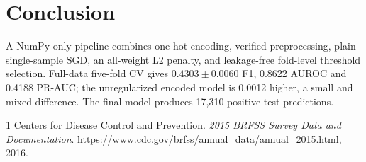 \documentclass[10pt,conference,compsocconf]{IEEEtran}
\begin{document}
\section{Conclusion}
A NumPy-only pipeline combines one-hot encoding, verified preprocessing, plain
single-sample SGD, an all-weight L2 penalty, and leakage-free fold-level
threshold selection. Full-data five-fold CV gives $0.4303\pm0.0060$ F1, 0.8622
AUROC and 0.4188 PR-AUC; the unregularized encoded model is 0.0012 higher, a
small and mixed difference. The final model produces 17{,}310 positive test
predictions.

\begin{thebibliography}{1}
Centers for Disease Control and Prevention.
\textit{2015 BRFSS Survey Data and Documentation}.
\url{https://www.cdc.gov/brfss/annual_data/annual_2015.html}, 2016.
\end{thebibliography}
\end{document}
